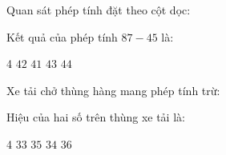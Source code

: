 \begin{ex} %
Quan sát phép tính đặt theo cột dọc:
\begin{center}\vspace{-2.5mm}
\vspace{-2.5mm}\end{center}
Kết quả của phép tính $87 - 45$ là:
\begin{multicols}{4}
\choice
{\True $42$}
{$41$}
{$43$}
{$44$}
\end{multicols}
\end{ex}

\begin{ex} %
Xe tải chở thùng hàng mang phép tính trừ:
\begin{center}\vspace{-2.5mm}
\vspace{-2.5mm}\end{center}
Hiệu của hai số trên thùng xe tải là:
\begin{multicols}{4}
\choice
{$33$}
{$35$}
{\True $34$}
{$36$}
\end{multicols}
\end{ex}

\newpage

